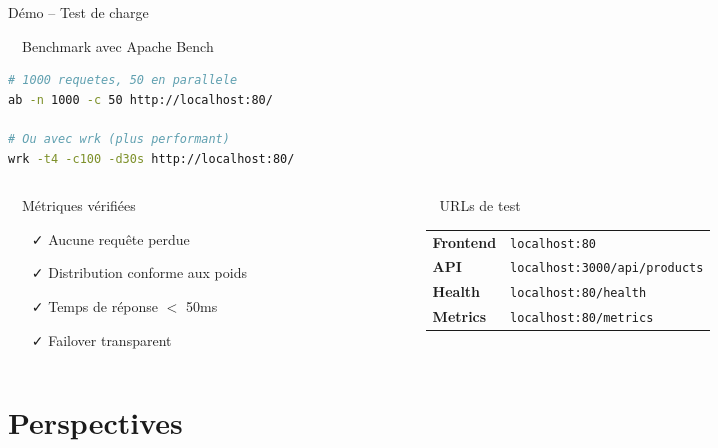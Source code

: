 \documentclass[aspectratio=169,12pt]{beamer}
\begin{document}
\begin{frame}[fragile]{Démo -- Test de charge}
\begin{block}{\faTerminal\ \ Benchmark avec Apache Bench}
\begin{lstlisting}[language=bash]
# 1000 requetes, 50 en parallele
ab -n 1000 -c 50 http://localhost:80/

# Ou avec wrk (plus performant)
wrk -t4 -c100 -d30s http://localhost:80/
\end{lstlisting}
\end{block}

\vspace{0.5em}
\begin{columns}
\begin{column}{0.48\textwidth}
\begin{exampleblock}{\faCheckCircle\ \ Métriques vérifiées}
\begin{itemize}
  \item[\faCheck] Aucune requête perdue
  \item[\faCheck] Distribution conforme aux poids
  \item[\faCheck] Temps de réponse $<$ 50ms
  \item[\faCheck] Failover transparent
\end{itemize}
\end{exampleblock}
\end{column}
\begin{column}{0.48\textwidth}
\begin{block}{\faLink\ \ URLs de test}
\footnotesize
\begin{tabular}{ll}
\textbf{Frontend} & \texttt{localhost:80} \\
\textbf{API} & \texttt{localhost:3000/api/products} \\
\textbf{Health} & \texttt{localhost:80/health} \\
\textbf{Metrics} & \texttt{localhost:80/metrics} \\
\end{tabular}
\end{block}
\end{column}
\end{columns}
\end{frame}

\section{Perspectives}
\end{document}
